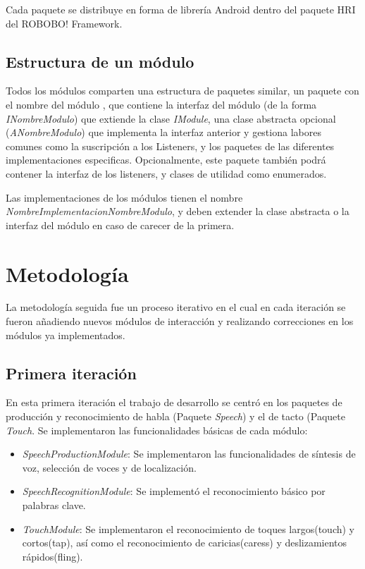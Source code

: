 Cada paquete se distribuye en forma de librería Android dentro del paquete HRI del ROBOBO! Framework.

\subsection{Estructura de un módulo}

Todos los módulos comparten una estructura de paquetes similar, un paquete con el nombre del módulo , que contiene la interfaz del módulo (de la forma \textit{INombreModulo}) que extiende la clase \textit{IModule}, una clase abstracta opcional (\textit{ANombreModulo}) que implementa la interfaz anterior y gestiona labores comunes como la suscripción a los Listeners, y los paquetes de las diferentes implementaciones especificas. Opcionalmente, este paquete también podrá contener la interfaz de los listeners, y clases de utilidad como enumerados.

Las implementaciones de los módulos tienen el nombre \textit{NombreImplementacionNombreModulo}, y deben extender la clase abstracta o la interfaz del módulo en caso de carecer de la primera.

\section{Metodología}

La metodología seguida fue un proceso iterativo en el cual en cada iteración se fueron añadiendo nuevos módulos de interacción y realizando correcciones en los módulos ya implementados.
\subsection{Primera iteración}

En esta primera iteración el trabajo de desarrollo se centró en los paquetes de producción y reconocimiento de habla (Paquete \textit{Speech}) y el de tacto (Paquete \textit{Touch}. Se implementaron las funcionalidades básicas de cada módulo:
\begin{itemize}
	\item \textit{SpeechProductionModule}: Se implementaron las funcionalidades de síntesis de voz, selección de voces y de localización.
	\item \textit{SpeechRecognitionModule}: Se implementó el reconocimiento básico por palabras clave.
	\item \textit{TouchModule}: Se implementaron el reconocimiento de toques largos(touch) y cortos(tap), así como el reconocimiento de caricias(caress) y deslizamientos rápidos(fling).
\end{itemize} 

